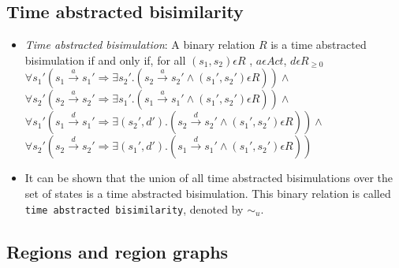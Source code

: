 \documentclass{article}
\begin{document}
\subsection{Time abstracted bisimilarity}

\begin{itemize}

  \item \emph{Time abstracted bisimulation}: A binary relation $R$ is
    a time abstracted
    bisimulation if and only if, for all $(s_1, s_2) \epsilon R$ , $a \epsilon Act $, $d \epsilon R_{\ge 0}$\\
    $\forall s_1' (s_1 \xrightarrow{a} s_1' \Rightarrow \exists s_2'
    . (s_2 \xrightarrow{a} s_2' \wedge (s_1', s_2') \epsilon R ) )
    \wedge $ \\
    $\forall s_2' (s_2 \xrightarrow{a} s_2' \Rightarrow \exists s_1'
    . (s_1 \xrightarrow{a} s_1' \wedge (s_1', s_2') \epsilon R ) ) \wedge $ \\
    $\forall s_1' (s_1 \xrightarrow{d} s_1' \Rightarrow \exists (s_2',
    d')
    . (s_2 \xrightarrow{d} s_2' \wedge (s_1', s_2') \epsilon R ) )
    \wedge $ \\
    $\forall s_2' (s_2 \xrightarrow{d} s_2' \Rightarrow \exists (s_1', d')
    . (s_1 \xrightarrow{d} s_1' \wedge (s_1', s_2') \epsilon R ) ) $ \\
    
  \item It can be shown that the union of all time abstracted bisimulations
    over the set of states is a time abstracted bisimulation. This binary
    relation is called \texttt{time abstracted bisimilarity}, denoted by $\sim_u$.


\end{itemize}

\subsection{Regions and region graphs}
\end{document}
